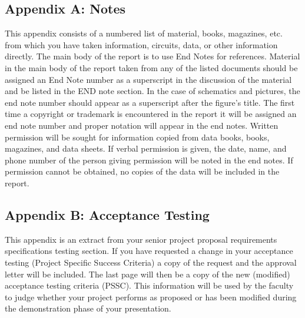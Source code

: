 \documentclass[12pt]{article}
\begin{document}
\subsection*{Appendix A: Notes}
This appendix consists of a numbered list of material, books, magazines, etc. from which you have taken information, circuits, data, or other information directly. The main body of the report is to use End Notes for references. Material in the main body of the report taken from any of the listed documents should be assigned an End Note number as a superscript in the discussion of the material and be listed in the END note section. In the case of schematics and pictures, the end note number should appear as a superscript after the figure's title. The first time a copyright or trademark is encountered in the report it
will be assigned an end note number and proper notation will appear in the end notes. Written permission will be sought for information copied from data books, books, magazines, and data sheets. If verbal permission is given, the date, name, and phone number of the person giving permission will be noted in the end notes. If permission cannot be obtained, no copies of the data will be included in the report.

\subsection*{Appendix B: Acceptance Testing}
This appendix is an extract from your senior project proposal requirements specifications testing section. If you have requested a change in your acceptance testing (Project Specific Success Criteria) a copy of the request and the approval letter will be included. The last page will then be a copy of the new (modified) acceptance testing criteria (PSSC). This information will be used by the faculty to judge whether your project performs as proposed or has been modified during the demonstration phase of your presentation.
\end{document}
